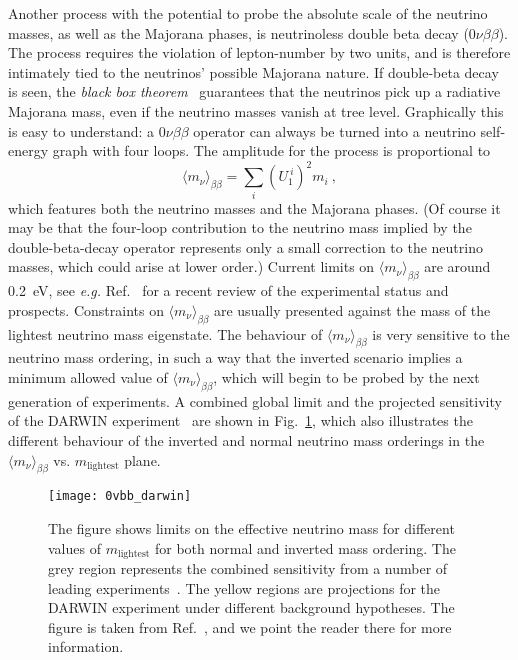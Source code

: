 Another process with the potential to probe the absolute scale of the neutrino
masses, as well as the Majorana phases, is neutrinoless double beta decay
($0\nu\beta\beta$). The process requires the violation of lepton-number by two
units, and is therefore intimately tied to the neutrinos' possible Majorana
nature. If double-beta decay is seen, the \textit{black box
  theorem}~\cite{Schechter:1981bd, Takasugi:1984xr, Hirsch:2006yk} guarantees
that the neutrinos pick up a radiative Majorana mass, even if the neutrino
masses vanish at tree level. Graphically this is easy to understand: a
$0\nu\beta\beta$ operator can always be turned into a neutrino self-energy graph
with four loops. The amplitude for the process is proportional to
\begin{equation}
  \langle m_{\nu} \rangle_{\beta\beta} = \sum_{i} (U_{1}^{\ i})^{2} m_{i} \ ,
\end{equation}
which features both the neutrino masses and the Majorana phases. (Of course it
may be that the four-loop contribution to the neutrino mass implied by the
double-beta-decay operator represents only a small correction to the neutrino
masses, which could arise at lower order.) Current limits on
$\langle m_{\nu} \rangle_{\beta\beta}$ are around \SI{0.2}{\eV}, see
\textit{e.g.} Ref.~\cite{Dolinski:2019nrj} for a recent review of the
experimental status and prospects. Constraints on
$\langle m_{\nu} \rangle_{\beta\beta}$ are usually presented against the mass of
the lightest neutrino mass eigenstate. The behaviour of
$\langle m_{\nu} \rangle_{\beta\beta}$ is very sensitive to the neutrino mass
ordering, in such a way that the inverted scenario implies a minimum allowed
value of $\langle m_{\nu} \rangle_{\beta\beta}$, which will begin to be probed
by the next generation of experiments. A combined global limit and the projected
sensitivity of the DARWIN experiment~\cite{Agostini:2020adk} are shown in
Fig.~\ref{fig:ch1-0vbb-darwin}, which also illustrates the different behaviour of
the inverted and normal neutrino mass orderings in the
$\langle m_{\nu} \rangle_{\beta\beta}$ vs. $m_{\text{lightest}}$ plane.

\begin{figure}[t]
  \centering
  \texttt{[image: 0vbb\_darwin]}
  \caption[The figure shows limits on the effective neutrino mass for different
  values of $m_{\text{lightest}}$ for both normal and inverted mass
  ordering.]{The figure shows limits on the effective neutrino mass for
    different values of $m_{\text{lightest}}$ for both normal and inverted mass
    ordering. The grey region represents the combined sensitivity from a number
    of leading experiments~\cite{Agostini:2019hzm}. The yellow regions are
    projections for the DARWIN experiment under different background hypotheses.
    The figure is taken from Ref.~\cite{Agostini:2020adk}, and we point the
    reader there for more information.}
  \label{fig:ch1-0vbb-darwin}
\end{figure}

